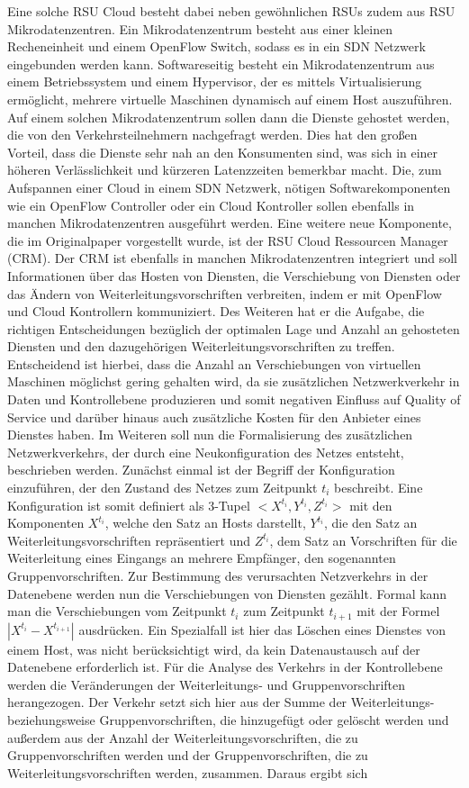 \documentclass[conference]{IEEEtran}
\begin{document}
Eine solche RSU Cloud besteht dabei neben gewöhnlichen RSUs zudem aus RSU Mikrodatenzentren. Ein Mikrodatenzentrum besteht aus einer kleinen Recheneinheit und einem OpenFlow Switch, sodass es in ein SDN Netzwerk eingebunden werden kann. Softwareseitig besteht ein Mikrodatenzentrum aus einem Betriebssystem und einem Hypervisor, der es mittels Virtualisierung ermöglicht, mehrere virtuelle Maschinen dynamisch auf einem Host auszuführen. Auf einem solchen Mikrodatenzentrum sollen dann die Dienste gehostet werden, die von den Verkehrsteilnehmern nachgefragt werden. Dies hat den großen Vorteil, dass die Dienste sehr \glqq nah\grqq{} an den Konsumenten sind, was sich in einer höheren Verlässlichkeit und kürzeren Latenzzeiten bemerkbar macht. Die, zum Aufspannen einer Cloud in einem SDN Netzwerk, nötigen Softwarekomponenten wie ein OpenFlow Controller oder ein Cloud Kontroller sollen ebenfalls in manchen Mikrodatenzentren ausgeführt werden. Eine weitere neue Komponente, die im Originalpaper vorgestellt wurde, ist der RSU Cloud Ressourcen Manager (CRM). Der CRM ist ebenfalls in manchen Mikrodatenzentren integriert und soll Informationen über das Hosten von Diensten, die Verschiebung von Diensten oder das Ändern von Weiterleitungsvorschriften verbreiten, indem er mit OpenFlow und Cloud Kontrollern kommuniziert. Des Weiteren hat er die Aufgabe, die richtigen Entscheidungen bezüglich der optimalen Lage und Anzahl an gehosteten Diensten und den dazugehörigen Weiterleitungsvorschriften zu treffen. Entscheidend ist hierbei, dass die Anzahl an Verschiebungen von virtuellen Maschinen möglichst gering gehalten wird, da sie zusätzlichen Netzwerkverkehr in Daten und Kontrollebene produzieren und somit negativen Einfluss auf Quality of Service und darüber hinaus auch zusätzliche Kosten für den Anbieter eines Dienstes haben. Im Weiteren soll nun die Formalisierung des zusätzlichen Netzwerkverkehrs, der durch eine Neukonfiguration des Netzes entsteht, beschrieben werden. Zunächst einmal ist der Begriff der Konfiguration einzuführen, der den Zustand des Netzes zum Zeitpunkt \(t_i\) beschreibt. Eine Konfiguration ist somit definiert als 3-Tupel \(<X^{t_i},Y^{t_i},Z^{t_i}>\) mit den Komponenten $X^{t_i}$, welche den Satz an Hosts darstellt, \(Y^{t_i}\), die den Satz an Weiterleitungsvorschriften repräsentiert und \(Z^{t_i}\),  dem Satz an Vorschriften für die Weiterleitung eines Eingangs an mehrere Empfänger, den sogenannten Gruppenvorschriften. Zur Bestimmung des verursachten Netzverkehrs in der Datenebene werden nun die Verschiebungen von Diensten gezählt. Formal kann man die Verschiebungen vom Zeitpunkt \(t_i\) zum Zeitpunkt \(t_{i+1}\) mit der Formel \(|X^{t_i}-X^{t_{i+1}}|\) ausdrücken. Ein Spezialfall ist hier das Löschen eines Dienstes von einem Host, was nicht berücksichtigt wird, da kein Datenaustausch auf der Datenebene erforderlich ist. Für die Analyse des Verkehrs in der Kontrollebene werden die Veränderungen der Weiterleitungs- und Gruppenvorschriften herangezogen. Der Verkehr setzt sich hier aus der Summe der Weiterleitungs-beziehungsweise Gruppenvorschriften, die hinzugefügt oder gelöscht werden und außerdem aus der Anzahl der Weiterleitungsvorschriften, die zu Gruppenvorschriften werden und der Gruppenvorschriften, die zu Weiterleitungsvorschriften werden, zusammen. Daraus ergibt sich 
\end{document}
